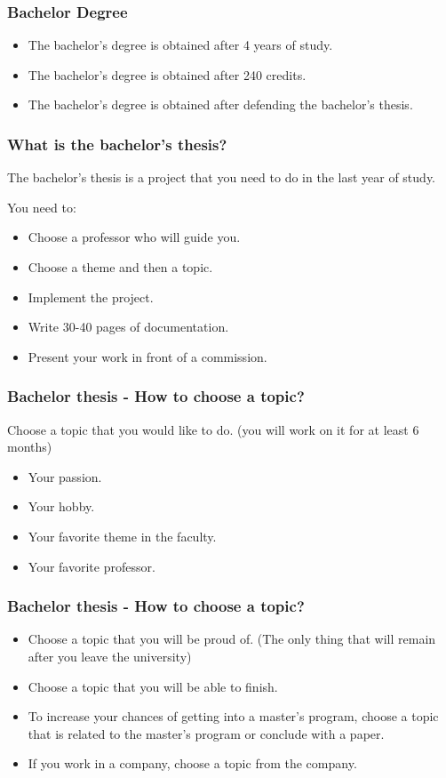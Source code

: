 \begin{frame}
\frametitle{Bachelor Degree}
\begin{itemize}
    \item The bachelor's degree is obtained after 4 years of study.
    \item The bachelor's degree is obtained after 240 credits.
    \item The bachelor's degree is obtained after defending the bachelor's thesis.
\end{itemize}
\end{frame}

\begin{frame}
\frametitle{What is the bachelor's thesis?}
The bachelor's thesis is a project that you need to do in the last year of study.

You need to:
\begin{itemize}
    \item Choose a professor who will guide you.
    \item Choose a theme and then a topic.
    \item Implement the project.
    \item Write 30-40 pages of documentation.
    \item Present your work in front of a commission.
\end{itemize}
\end{frame}

\begin{frame}
\frametitle{Bachelor thesis - How to choose a topic?}
 Choose a topic that you would  like to do. (you will work on it for at least 6 months)
    \begin{itemize}
        \item Your passion.
        \item Your hobby.
        \item Your favorite theme in the faculty.
        \item Your favorite professor.
    \end{itemize}
\end{frame}

\begin{frame}
    \frametitle{Bachelor thesis - How to choose a topic?}
    \begin{itemize}
        \item Choose a topic that you will be proud  of. (The only thing that will remain after you leave the university)
        \item Choose a topic that you will be able to finish.
        \item To increase your chances of getting into a master's program, choose a topic that is related to the master's program or conclude with a paper.
        \item If you work in a company, choose a topic from the company.
    \end{itemize}
\end{frame}

